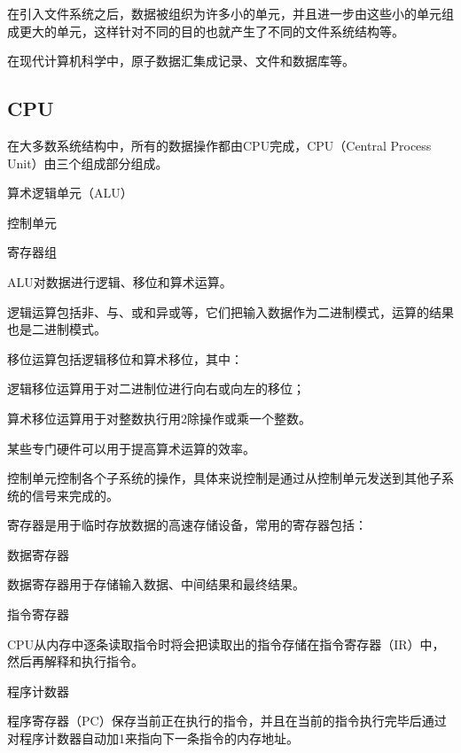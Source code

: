 在引入文件系统之后，数据被组织为许多小的单元，并且进一步由这些小的单元组成更大的单元，这样针对不同的目的也就产生了不同的文件系统结构等。

在现代计算机科学中，原子数据汇集成记录、文件和数据库等。

\subsection{CPU}

在大多数系统结构中，所有的数据操作都由CPU完成，CPU（Central Process Unit）由三个组成部分组成。

\begin{compactitem}
\item 算术逻辑单元（ALU）
\item 控制单元
\item 寄存器组
\end{compactitem}

ALU对数据进行逻辑、移位和算术运算。

\begin{compactitem}
\item 逻辑运算包括非、与、或和异或等，它们把输入数据作为二进制模式，运算的结果也是二进制模式。
\item 移位运算包括逻辑移位和算术移位，其中：

\begin{compactitem}
\item 逻辑移位运算用于对二进制位进行向右或向左的移位；
\item 算术移位运算用于对整数执行用2除操作或乘一个整数。
\end{compactitem}

\item 某些专门硬件可以用于提高算术运算的效率。
\end{compactitem}

控制单元控制各个子系统的操作，具体来说控制是通过从控制单元发送到其他子系统的信号来完成的。

寄存器是用于临时存放数据的高速存储设备，常用的寄存器包括：

\begin{compactitem}
\item 数据寄存器

数据寄存器用于存储输入数据、中间结果和最终结果。

\item 指令寄存器

CPU从内存中逐条读取指令时将会把读取出的指令存储在指令寄存器（IR）中，然后再解释和执行指令。

\item 程序计数器

程序寄存器（PC）保存当前正在执行的指令，并且在当前的指令执行完毕后通过对程序计数器自动加1来指向下一条指令的内存地址。
\end{compactitem}


